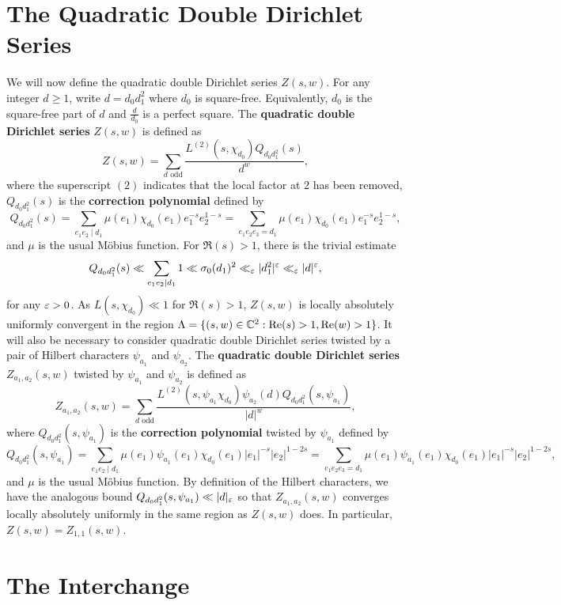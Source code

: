 \documentclass[12pt,reqno,oneside]{amsart}
\begin{document}
\section*{The Quadratic Double Dirichlet Series}
    We will now define the quadratic double Dirichlet series $Z(s,w)$. For any integer $d \ge 1$, write $d = d_{0}d_{1}^{2}$ where $d_{0}$ is square-free. Equivalently, $d_{0}$ is the square-free part of $d$ and $\frac{d}{d_{0}}$ is a perfect square. The \textbf{quadratic double Dirichlet series} $Z(s,w)$ is defined as
    \[
        Z(s,w) = \sum_{\text{$d$ odd}}\frac{L^{(2)}(s,\chi_{d_{0}})Q_{d_{0}d_{1}^{2}}(s)}{d^{w}},
    \]
    where the superscript $(2)$ indicates that the local factor at $2$ has been removed, $Q_{d_{0}d_{1}^{2}}(s)$ is the \textbf{correction polynomial} defined by
    \[
        Q_{d_{0}d_{1}^{2}}(s) = \sum_{e_{1}e_{2} \mid d_{1}}\mu(e_{1})\chi_{d_{0}}(e_{1})e_{1}^{-s}e_{2}^{1-s} = \sum_{e_{1}e_{2}e_{3} = d_{1}}\mu(e_{1})\chi_{d_{0}}(e_{1})e_{1}^{-s}e_{2}^{1-s},
    \]
    and $\mu$ is the usual M\"obius function. For $\Re(s) > 1$, there is the trivial estimate
    \[
        Q_{d_{0}d_{1}^{2}}(s) \ll \sum_{e_{1}e_{2} \mid d_{1}}1 \ll \sigma_{0}(d_{1})^{2} \ll_{\varepsilon} |d_{1}^{2}|^{\varepsilon} \ll_{\varepsilon} |d|^{\varepsilon},
    \]
     for any $\varepsilon > 0$. As $L(s,\chi_{d_{0}}) \ll 1$ for $\Re(s) > 1$, $Z(s,w)$ is locally absolutely uniformly convergent in the region $\Lambda = \{(s,w) \in \mathbb{C}^{2}:\mathrm{Re}(s) > 1, \mathrm{Re}(w) > 1\}$. It will also be necessary to consider quadratic double Dirichlet series twisted by a pair of Hilbert characters $\psi_{a_{1}}$ and $\psi_{a_{2}}$. The \textbf{quadratic double Dirichlet series} $Z_{a_{1},a_{2}}(s,w)$ twisted by $\psi_{a_{1}}$ and $\psi_{a_{2}}$ is defined as
    \[
        Z_{a_{1},a_{2}}(s,w) = \sum_{\text{$d$ odd}}\frac{L^{(2)}(s,\psi_{a_{1}}\chi_{d_{0}})\psi_{a_{2}}(d)Q_{d_{0}d_{1}^{2}}(s,\psi_{a_{1}})}{|d|^{w}},
    \]
    where $Q_{d_{0}d_{1}^{2}}(s,\psi_{a_{1}})$ is the \textbf{correction polynomial} twisted by $\psi_{a_{1}}$ defined by
    \[
        Q_{d_{0}d_{1}^{2}}(s,\psi_{a_{1}}) = \sum_{e_{1}e_{2} \mid d_{1}}\mu(e_{1})\psi_{a_{1}}(e_{1})\chi_{d_{0}}(e_{1})|e_{1}|^{-s}|e_{2}|^{1-2s} = \sum_{e_{1}e_{2}e_{3} = d_{1}}\mu(e_{1})\psi_{a_{1}}(e_{1})\chi_{d_{0}}(e_{1})|e_{1}|^{-s}|e_{2}|^{1-2s},
    \]
    and $\mu$ is the usual M\"obius function. By definition of the Hilbert characters, we have the analogous bound $Q_{d_{0}d_{1}^{2}}(s,\psi_{a_{1}}) \ll |d|_{\varepsilon}$ so that $Z_{a_{1},a_{2}}(s,w)$ converges locally absolutely uniformly in the same region as $Z(s,w)$ does. In particular, $Z(s,w) = Z_{1,1}(s,w)$.
\section*{The Interchange}
\end{document}
